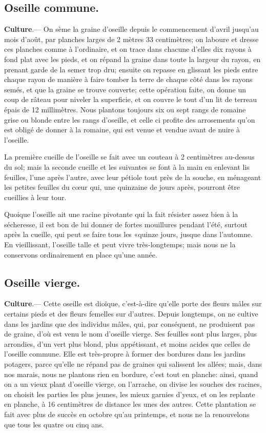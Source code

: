 \documentclass[10pt,a4paper]{book}
\begin{document}
\subsection{Oseille commune.}

\textbf{Culture}.--- On sème la graine d'oseille depuis le commencement d'avril jusqu'au mois d'août, par planches larges de 2 mètres 33 centimètres; on laboure et dresse ces planches comme à l'ordinaire, et on trace dans chacune d'elles dix rayons à fond plat avec les pieds, et on répand la graine dans toute la largeur du rayon, en prenant garde de la semer trop dru; ensuite on repasse en glissant les pieds entre chaque rayon de manière à faire tomber la terre de chaque côté dans les rayons semés, et que la graine se trouve couverte; cette opération faite, on donne un coup de râteau pour niveler la superficie, et on couvre le tout d'un lit de terreau épais de 12 millimètres. Nous plantons toujours six ou sept rangs de romaine grise ou blonde entre les rangs d'oseille, et celle ci profite des arrosements qu'on est obligé de donner à la romaine, qui est venue et vendue avant de nuire à l'oseille.

La première cueille de l'oseille se fait avec un couteau à 2 centimètres au-dessus du sol; mais la seconde cueille et les suivantes se font à la main en enlevant lis feuilles, l'une après l'autre, avec leur pétiole tout près de la souche, en ménageant les petites feuilles du cœur qui, une quinzaine de jours après, pourront être cueillies à leur tour.

Quoique l'oseille ait une racine pivotante qui la fait résister assez bien à la sécheresse, il est bon de lui donner de fortes mouillures pendant l'été, surtout après la cueille, qui peut se faire tous les «quinze jours, jusque dans l'automne. En vieillissant, l'oseille talle et peut vivre très-longtemps; mais nous ne la conservons ordinairement en place qu'une année.

\subsection{Oseille vierge.}

\textbf{Culture}.--- Cette oseille est dioïque, c'est-à-dire qu'elle porte des fleurs mâles sur certains pieds et des fleurs femelles sur d'autres. Depuis longtemps, on ne cultive dans les jardins que des individus mâles, qui, par conséquent, ne produisent pas de graine, d'où est venu le nom d'oseille vierge. Ses feuilles sont plus larges, plus arrondies, d'un vert plus blond, plus appétissant, et moins acides que celles de l'oseille commune. Elle est très-propre à former des bordures dans les jardins potagers, parce qu'elle ne répand pas de graines qui salissent les allées; mais, dans nos marais, nous ne plantons rien en bordure, c'est tout en planche: ainsi, quand on a un vieux plant d'oseille vierge, on l'arrache, on divise les souches des racines, on choisit les parties les plus jeunes, les mieux garnies d'yeux, et on les replante en planche, à 16 centimètres de distance les unes des autres. Cette plantation se fait avec plus de succès en octobre qu'au printemps, et nous ne la renouvelons que tous les quatre ou cinq ans.
\end{document}
